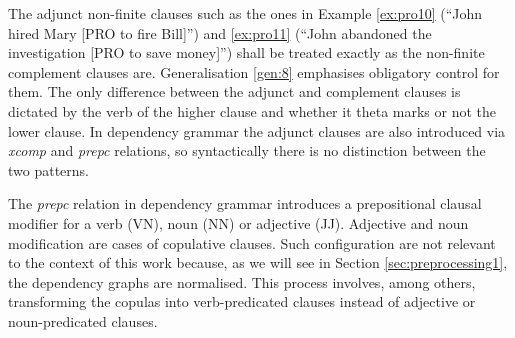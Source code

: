 
    The adjunct non-finite clauses such as the ones in Example \ref{ex:pro10} (``John hired Mary [PRO to fire Bill]'') and \ref{ex:pro11} (``John abandoned the investigation [PRO to save money]'') shall be treated exactly as the non-finite complement clauses are. Generalisation \ref{gen:8} emphasises obligatory control for them. The only difference between the adjunct and complement clauses is dictated by the verb of the higher clause and whether it theta marks or not the lower clause. In dependency grammar the adjunct clauses are also introduced via \textit{xcomp} and \textit{prepc} relations, so syntactically there is no distinction between the two patterns.


    The \textit{prepc} relation in dependency grammar introduces a prepositional clausal modifier for a verb (VN), noun (NN) or adjective (JJ). Adjective and noun modification are cases of copulative clauses. Such configuration are not relevant to the context of this work  because, as we will see in Section \ref{sec:preprocessing1}, the dependency graphs are normalised. This process involves, among others, transforming the copulas into verb-predicated clauses instead of adjective or noun-predicated clauses. 


